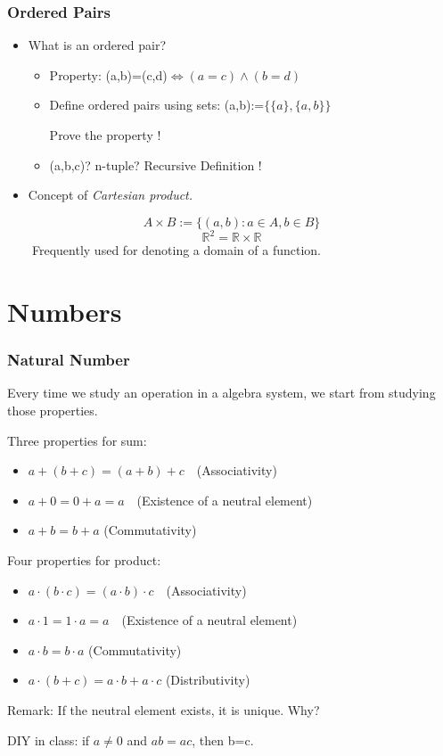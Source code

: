 \documentclass{beamer}
\newcommand{\myfont}{\rmfamily\normalsize\upshape\mdseries}
\begin{document}
\begin{frame}
    \frametitle{Ordered Pairs}
    \begin{itemize}
        \item What is an ordered pair?
              \begin{itemize}
                  \item Property: (a,b)=(c,d)$\Leftrightarrow (a=c)\wedge (b=d)$
                  \item Define ordered pairs using sets:
                        (a,b):=$\{\{a\},\{a,b\}\}$

                        Prove the property !
                  \item (a,b,c)? n-tuple? Recursive Definition !
              \end{itemize}
              \vspace{6em}
        \item Concept of \itshape{Cartesian product}\myfont.

    \end{itemize}
    \vspace{1em}
    $$A \times B := \{(a,b):a \in A, b \in B\}$$
    $$\mathbb{R}^2=\mathbb{R} \times \mathbb{R}$$ $\qquad$Frequently used for denoting a domain of a function.
    \vspace*{7em}
\end{frame}



\section{Numbers}
\begin{frame}
    \frametitle{Natural Number}
    Every time we study an operation in a algebra system, we start from studying those properties.

    \vspace{0.7em}
    Three properties for sum:
    \begin{itemize}
        \item $a+(b+c)=(a+b)+c\quad$(Associativity)
        \item $a+0=0+a=a\quad$(Existence of a neutral element)
        \item $a+b=b+a$ (Commutativity)
    \end{itemize}
    Four properties for product:
    \begin{itemize}
        \item $a\cdot (b\cdot c)=(a\cdot b)\cdot c\quad$(Associativity)
        \item $a\cdot 1=1\cdot a=a\quad$(Existence of a neutral element)
        \item $a\cdot b=b\cdot a$ (Commutativity)
        \item $a\cdot (b+c)=a\cdot b+a\cdot c$ (Distributivity)
    \end{itemize}

    Remark: If the neutral element exists, it is unique. Why?

    DIY in class: if $a\neq 0$ and $ab=ac$, then b=c.
    \vspace{1em}
\end{frame}
\end{document}
